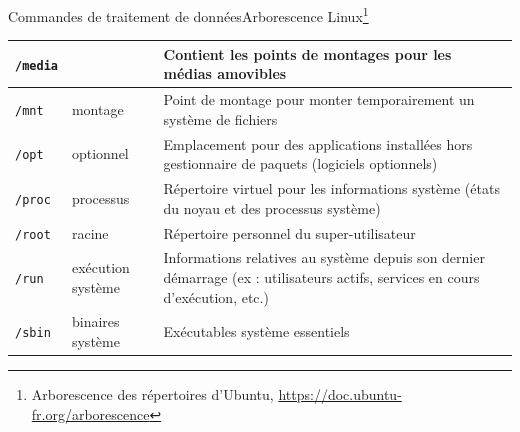 \documentclass{beamer}
\begin{document}
\begin{frame}{Commandes de traitement de données}{Arborescence Linux\footnote{\label{arborescence-linux}Arborescence des répertoires d’Ubuntu, \url{https://doc.ubuntu-fr.org/arborescence}}}
\begin{tiny}
\begin{table}[h!]
\begin{tabular}{|l|p{3cm}|p{6cm}|}
                    \hline
                    \lstinline{/media}  &                                      & Contient les points de montages pour les médias amovibles                                                                      \\
                    \hline
                    \lstinline{/mnt}    & montage                              & Point de montage pour monter temporairement un système de fichiers                                                             \\
                    \hline
                    \lstinline{/opt}    & optionnel                            & Emplacement pour des applications installées hors gestionnaire de paquets (logiciels optionnels)                               \\
                    \hline
                    \lstinline{/proc}   & processus                            & Répertoire virtuel pour les informations système (états du noyau et des processus système)                                     \\
                    \hline
                    \lstinline{/root}   & racine                               & Répertoire personnel du super-utilisateur                                                                                      \\
                    \hline
                    \lstinline{/run}    & exécution système                    & Informations relatives au système depuis son dernier démarrage (ex : utilisateurs actifs, services en cours d'exécution, etc.) \\
                    \hline
                    \lstinline{/sbin}   & binaires système                     & Exécutables système essentiels                                                                                                 \\
                    \hline
                \end{tabular}
            \end{table}
        \end{tiny}
    \end{frame}
\end{document}

